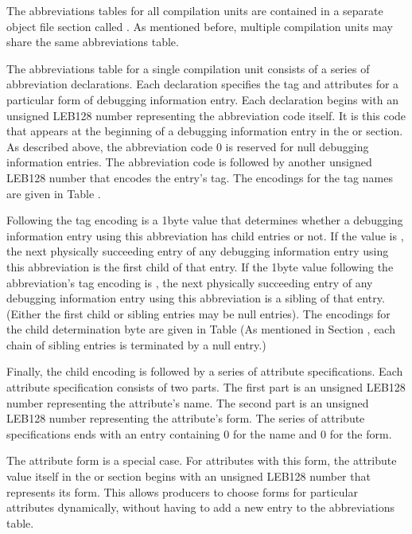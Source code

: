 The abbreviations tables for all compilation units
are contained in a separate object file section called
.
As mentioned before, multiple compilation
units may share the same abbreviations table.

The abbreviations table for a single compilation unit consists
of a series of abbreviation declarations. Each declaration
specifies the tag and attributes for a particular form of
debugging information entry. Each declaration begins with
an unsigned LEB128 number representing the abbreviation
code itself. It is this code that appears at the beginning
of a debugging information entry in the 
 or
section. As described above, the abbreviation
code 0 is reserved for null debugging information entries. The
abbreviation code is followed by another unsigned LEB128
number that encodes the entry’s tag. The encodings for the
tag names are given in 
Table .

Following the tag encoding is a 1\dash byte value that determines
whether a debugging information entry using this abbreviation
has child entries or not. If the value is 
,
the next physically succeeding entry of any debugging
information entry using this abbreviation is the first
child of that entry. If the 1\dash byte value following the
abbreviation’s tag encoding is 
, the next
physically succeeding entry of any debugging information entry
using this abbreviation is a sibling of that entry. (Either
the first child or sibling entries may be null entries). The
encodings for the child determination byte are given in 
Table 
(As mentioned in 
Section , 
each chain of sibling entries is terminated by a null entry.)

Finally, the child encoding is followed by a series of
attribute specifications. Each attribute specification
consists of two parts. The first part is an unsigned LEB128
number representing the attribute’s name. The second part
is an unsigned LEB128 number representing the attribute’s
form. The series of attribute specifications ends with an
entry containing 0 for the name and 0 for the form.

The attribute form 
 is a special case. For
attributes with this form, the attribute value itself in the
 or 
section begins with an unsigned
LEB128 number that represents its form. This allows producers
to choose forms for particular attributes 
dynamically,
without having to add a new entry to the abbreviations table.

